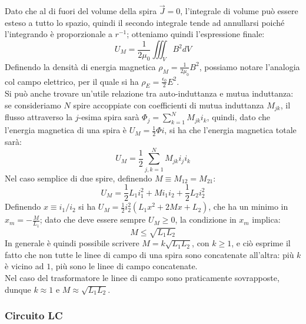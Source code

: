 \documentclass[]{article}
\begin{document}
Dato che al di fuori del volume della spira $ \vec{J} = 0 $, l'integrale di volume può essere esteso a tutto lo spazio, quindi il secondo integrale tende ad annullarsi poiché l'integrando è proporzionale a $ r^{-1} $; otteniamo quindi l'espressione finale:
\begin{equation}
	U_M = \frac{1}{2\mu_0} \iiint_V B^2 dV
	\label{eq:37}
\end{equation}
%
Definendo la densità di energia magnetica $ \rho_M = \frac{1}{2\mu_0}B^2 $, possiamo notare l'analogia col campo elettrico, per il quale si ha $ \rho_E = \frac{\epsilon_0}{2}E^2 $. \\ 
%
Si può anche trovare un'utile relazione tra auto-induttanza e mutua induttanza: se consideriamo $ N $ spire accoppiate con coefficienti di mutua induttanza $ M_{jk} $, il flusso attraverso la $ j $-esima spira sarà $ \Phi_j  = \sum_{k=1}^{N} M_{jk}i_k $, quindi, dato che l'energia magnetica di una spira è $ U_M = \frac{1}{2}\Phi i $, si ha che l'energia magnetica totale sarà:
\begin{equation}
	U_M = \frac{1}{2} \displaystyle\sum_{j,k=1}^{N} M_{jk} i_j i_k
	\label{eq:38}
\end{equation}
Nel caso semplice di due spire, definendo $ M \equiv M_{12} = M_{21} $:
\begin{equation}
	U_M = \frac{1}{2} L_1 i_1^2 + M i_1 i_2 + \frac{1}{2} L_2 i_2^2
	\label{eq:39}
\end{equation}
Definendo $ x \equiv i_1 / i_2 $ si ha $ U_M = \frac{1}{2} i_2^2 (L_1 x^2 + 2Mx + L_2) $, che ha un minimo in $ x_m = -\frac{M}{L_1} $; dato che deve essere sempre $ U_M \ge 0 $, la condizione in $ x_m $ implica:
\begin{equation}
	M \le \sqrt{L_1 L_2}
	\label{eq:40}
\end{equation}
%
In generale è quindi possibile scrivere $ M = k \sqrt{L_1 L_2} $, con $ k \ge 1 $, e ciò esprime il fatto che non tutte le linee di campo di una spira sono concatenate all'altra: più $ k $ è vicino ad $ 1 $, più sono le linee di campo concatenate. \\ 
Nel caso del trasformatore le linee di campo sono praticamente sovrapposte, dunque $ k \approx 1 $ e $ M \approx \sqrt{L_1 L_2} $.

\subsubsection{Circuito LC}
\end{document}
